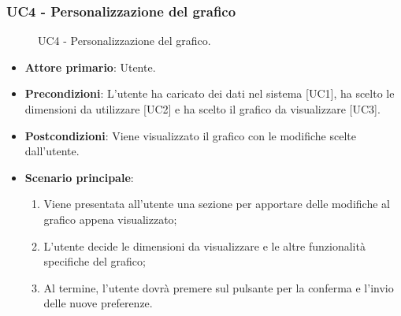 \subsubsection{UC4 - Personalizzazione del grafico}
\begin{figure}[h]
\centering
\caption{UC4 - Personalizzazione del grafico.}
\end{figure}
\begin{itemize}
	\item \textbf{Attore primario}: Utente.
	\item \textbf{Precondizioni}: L'utente ha caricato dei dati nel sistema [UC1], ha scelto le dimensioni da utilizzare [UC2] e ha scelto il grafico da visualizzare [UC3].
	\item \textbf{Postcondizioni}: Viene visualizzato il grafico con le modifiche scelte dall'utente.
	\item \textbf{Scenario principale}:
		\begin{enumerate}
			\item Viene presentata all'utente una sezione per apportare delle modifiche al grafico appena visualizzato;
			\item L'utente decide le dimensioni da visualizzare e le altre funzionalità specifiche del grafico;
			\item Al termine, l'utente dovrà premere sul pulsante per la conferma e l'invio delle nuove preferenze.
		\end{enumerate}
\end{itemize}